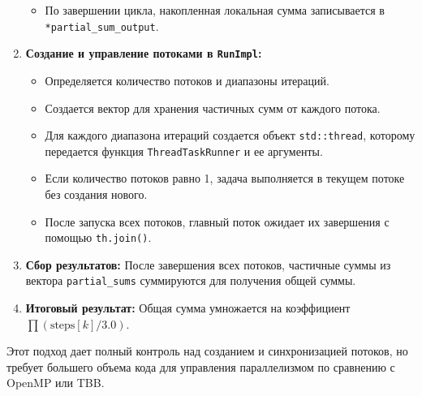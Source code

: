 \documentclass[a4paper,12pt]{article}
\begin{document}
\begin{enumerate}
\begin{itemize}
            \item По завершении цикла, накопленная локальная сумма записывается в \texttt{*partial\_sum\_output}.
        \end{itemize}
    \item \textbf{Создание и управление потоками в \texttt{RunImpl}:}
        \begin{itemize}
            \item Определяется количество потоков и диапазоны итераций.
            \item Создается вектор для хранения частичных сумм от каждого потока.
            \item Для каждого диапазона итераций создается объект \texttt{std::thread}, которому передается функция \texttt{ThreadTaskRunner} и ее аргументы.
            \item Если количество потоков равно 1, задача выполняется в текущем потоке без создания нового.
            \item После запуска всех потоков, главный поток ожидает их завершения с помощью \texttt{th.join()}.
        \end{itemize}
    \item \textbf{Сбор результатов:} После завершения всех потоков, частичные суммы из вектора \texttt{partial\_sums} суммируются для получения общей суммы.
    \item \textbf{Итоговый результат:} Общая сумма умножается на коэффициент $\prod (\text{steps}[k]/3.0)$.
\end{enumerate}
Этот подход дает полный контроль над созданием и синхронизацией потоков, но требует большего объема кода для управления параллелизмом по сравнению с OpenMP или TBB.
\end{document}
